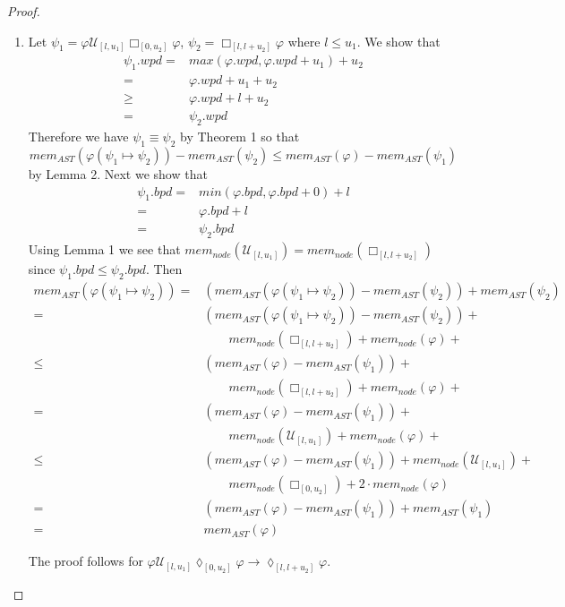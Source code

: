 \documentclass{article}
\begin{document}
\begin{proof}
\begin{enumerate}
    \item[(R8):]Let $\psi_1 = {\varphi}\mathcal{U}_{[l,u_1]}{\Box_{[0,u_2]}{\varphi}}$, $\psi_2 = \Box_{[l,l+u_2]}{\varphi}$ where $l \leq u_1$.
We show that 
\begin{align*}
\psi_1.wpd = & max(\varphi.wpd,\varphi.wpd+u_1)+u_2 \\
= & \varphi.wpd+u_1+u_2 \\
\geq & \varphi.wpd+l+u_2 \\
= & \psi_2.wpd
\end{align*}
Therefore we have $\psi_1 \equiv \psi_2$ by Theorem 1 so that 
$$
mem_{AST}(\varphi(\psi_1 \mapsto \psi_2)) - mem_{AST}(\psi_2) \leq mem_{AST}(\varphi) - mem_{AST}(\psi_1)
$$ 
by Lemma 2. Next we show that 
\begin{align*}
\psi_1.bpd = & min(\varphi.bpd,\varphi.bpd+0) + l \\
= & \varphi.bpd + l \\
= & \psi_2.bpd
\end{align*}
Using Lemma 1 we see that $mem_{node}(\mathcal{U}_{[l,u_1]}{}) = mem_{node}(\Box_{[l,l+u_2]})$ since $\psi_1.bpd \leq \psi_2.bpd$. Then
\begin{align*}
mem_{AST}(\varphi(\psi_1 \mapsto \psi_2)) = & (mem_{AST}(\varphi(\psi_1 \mapsto \psi_2)) - mem_{AST}(\psi_2)) + mem_{AST}(\psi_2) \\
= & (mem_{AST}(\varphi(\psi_1 \mapsto \psi_2)) - mem_{AST}(\psi_2)) + \\
&  \qquad mem_{node}(\Box_{[l,l+u_2]}) + mem_{node}(\varphi) + \\
\leq & (mem_{AST}(\varphi) - mem_{AST}(\psi_1)) + \\
&  \qquad mem_{node}(\Box_{[l,l+u_2]}) + mem_{node}(\varphi) + \\
= & (mem_{AST}(\varphi) - mem_{AST}(\psi_1)) + \\
&  \qquad mem_{node}(\mathcal{U}_{[l,u_1]}{}) + mem_{node}(\varphi) + \\
\leq & (mem_{AST}(\varphi) - mem_{AST}(\psi_1)) + mem_{node}(\mathcal{U}_{[l,u_1]}{}) + \\
&  \qquad  mem_{node}(\Box_{[0,u_2]}{}) + 2 \cdot mem_{node}(\varphi) \\
= & (mem_{AST}(\varphi) - mem_{AST}(\psi_1)) + mem_{AST}(\psi_1) \\
= & mem_{AST}(\varphi)
\end{align*}

The proof follows for ${\varphi}\mathcal{U}_{[l,u_1]}{\lozenge_{[0,u_2]}{\varphi}} \rightarrow \lozenge_{[l,l+u_2]}{\varphi}$.

\end{enumerate}

\end{proof}
\end{document}
